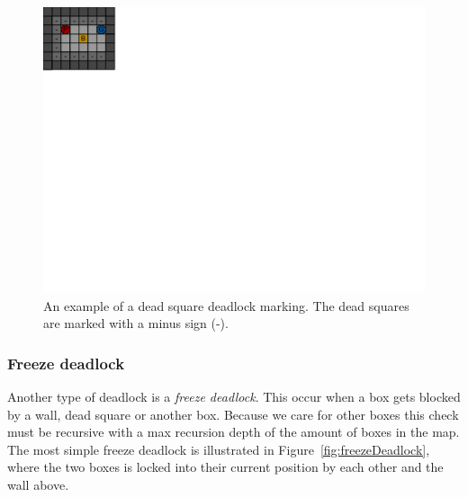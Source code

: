\documentclass[a4paper,11pt]{article}
\renewcommand{\*}[0]{\cdot}
\begin{document}
\begin{figure}[h!]
    \begin{center}
        \includegraphics{figures/deadSquareDeadlock}
    \end{center}
    \caption{An example of a dead square deadlock marking. The dead squares are
    marked with a minus sign (-).}
    \label{fig:deadSquareDeadlock}
\end{figure}

\subsubsection{Freeze deadlock}

Another type of deadlock is a \emph{freeze deadlock}. This occur when a box gets
blocked by a wall, dead square or another box. Because we care for other boxes
this check must be recursive with a max recursion depth of the amount of boxes
in the map. The most simple freeze deadlock is illustrated in
Figure~\ref{fig:freezeDeadlock}, where the two boxes is locked into their
current position by each other and the wall above.
\end{document}
